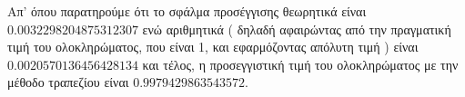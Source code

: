 \documentclass[Second Project.tex]{subfiles}
\begin{document}
Απ' όπου παρατηρούμε ότι το σφάλμα προσέγγισης θεωρητικά είναι \\ $0.0032298204875312307$ ενώ αριθμητικά ( δηλαδή 
αφαιρώντας από την πραγματική τιμή του ολοκληρώματος, που είναι 1, και εφαρμόζοντας απόλυτη τιμή ) είναι
$0.0020570136456428134$ και τέλος, η προσεγγιστική τιμή του ολοκληρώματος με την μέθοδο τραπεζίου
είναι $0.9979429863543572$. 
\end{document}
